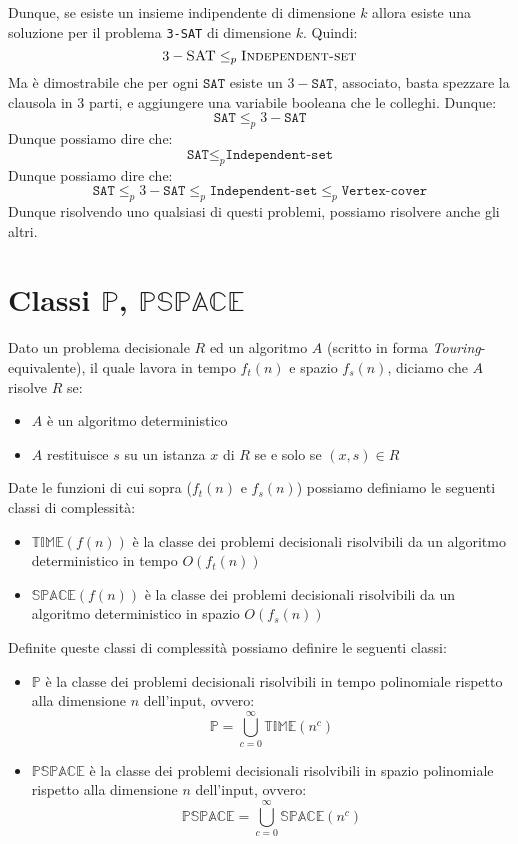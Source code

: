        Dunque, se esiste un insieme indipendente di dimensione $k$ allora esiste una soluzione per il problema \texttt{3-SAT} di dimensione $k$. Quindi: $$
            3-\textsc{SAT} \leq_p \textsc{Independent-set}
        $$
        Ma è dimostrabile che per ogni $\texttt{SAT}$ esiste un $3-\texttt{SAT}$, associato, basta spezzare la clausola in $3$ parti, e aggiungere una variabile booleana che le colleghi. Dunque:
        $$
            \texttt{SAT} \leq_p 3-\texttt{SAT}
        $$
        Dunque possiamo dire che:
        $$
            \texttt{SAT} \leq_p \texttt{Independent-set}
        $$
        Dunque possiamo dire che:
        $$
            \texttt{SAT} \leq_p 3-\texttt{SAT} \leq_p \texttt{Independent-set} \leq_p \texttt{Vertex-cover}
        $$
        Dunque risolvendo uno qualsiasi di questi problemi, possiamo risolvere anche gli altri.
\section{\texorpdfstring{Classi $\mathbb{P}$, $\mathbb{PSPACE}$}{Classi P, PSPACE}}
    Dato un problema decisionale $R$ ed un algoritmo $A$ (scritto in forma \textit{Touring}-equivalente), il quale lavora in tempo $f_t(n)$ e spazio $f_s(n)$, diciamo che $A$ risolve $R$ se:
    \begin{itemize}
        \item $A$ è un algoritmo deterministico
        \item $A$ restituisce $s$ su un istanza $x$ di $R$ se e solo se $(x,s)\in R$
    \end{itemize}
    Date le funzioni di cui sopra ($f_t(n)$ e $f_s(n)$) possiamo definiamo le seguenti classi di complessità:
    \begin{itemize}
        \item $\mathbb{TIME}(f(n))$ è la classe dei problemi decisionali risolvibili da un algoritmo deterministico in tempo $O(f_t(n))$
        \item $\mathbb{SPACE}(f(n))$ è la classe dei problemi decisionali risolvibili da un algoritmo deterministico in spazio $O(f_s(n))$
    \end{itemize}
    Definite queste classi di complessità possiamo definire le seguenti classi:
    \begin{itemize}
        \item $\mathbb{P}$ è la classe dei problemi decisionali risolvibili in tempo polinomiale rispetto alla dimensione $n$ dell'input, ovvero: $$
            \mathbb{P}=\bigcup_{c=0}^{\infty}\mathbb{TIME}(n^c)
        $$
        \item $\mathbb{PSPACE}$ è la classe dei problemi decisionali risolvibili in spazio polinomiale rispetto alla dimensione $n$ dell'input, ovvero: $$
            \mathbb{PSPACE}=\bigcup_{c=0}^{\infty}\mathbb{SPACE}(n^c)
        $$
    \end{itemize}
